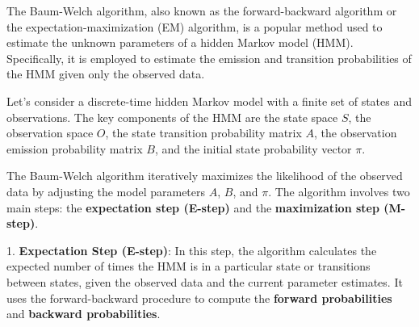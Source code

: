 \documentclass[a4paper,11pt]{article}
\begin{document}
The Baum-Welch algorithm, also known as the forward-backward algorithm or the expectation-maximization 
(EM) algorithm, is a popular method used to estimate the unknown parameters of a hidden Markov model (HMM). 
Specifically, it is employed to estimate the emission and transition probabilities of the HMM given only 
the observed data.


Let's consider a discrete-time hidden Markov model with a finite set of states and observations. The key 
components of the HMM are the state space $S$, the observation space $O$, the state transition probability 
matrix $A$, the observation emission probability matrix $B$, and the initial state probability vector 
$\pi$.

The Baum-Welch algorithm iteratively maximizes the likelihood of the observed data by adjusting the model 
parameters $A$, $B$, and $\pi$. The algorithm involves two main steps: the \textbf{expectation step (E-step)} 
and the \textbf{maximization step (M-step)}.

1. \textbf{Expectation Step (E-step)}: In this step, the algorithm calculates the expected number of times 
the HMM is in a particular state or transitions between states, given the observed data and the current parameter 
estimates. It uses the forward-backward procedure to compute the \textbf{forward probabilities} and 
\textbf{backward probabilities}.
\end{document}

